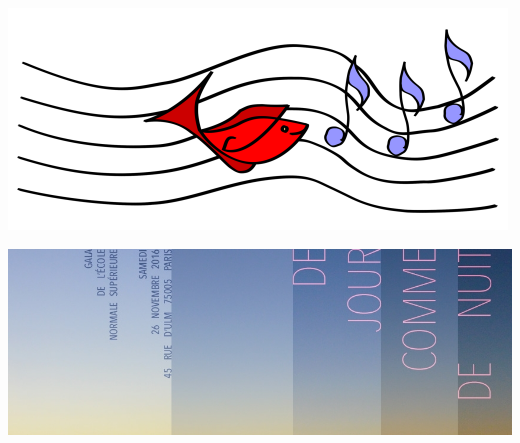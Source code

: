 \documentclass[a4paper,11pt]{article}
\begin{document}
\begin{center}
\includegraphics[scale=3]{logo.png}
\end{center}
\begin{center}
\includegraphics[scale=0.3]{logoNuit.jpg}
\end{center}
\end{document}
